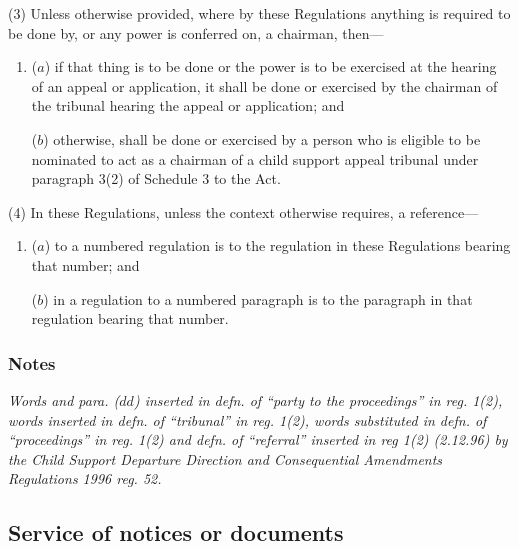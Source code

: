 \documentclass[a4paper]{article}
\newcommand\amendment[1]{\subsubsection*{Notes}{\itshape\frenchspacing\footnotesize #1 \par}}
\begin{document}
(3) Unless otherwise provided, where by these Regulations anything is required to be done by, or any power is conferred on, a chairman, then---
\begin{enumerate}\item[]
($a$) if that thing is to be done or the power is to be exercised at the hearing of an appeal or application, it shall be done or exercised by the chairman of the tribunal hearing the appeal or application; and

($b$) otherwise, shall be done or exercised by a person who is eligible to be nominated to act as a chairman of a child support appeal tribunal under paragraph 3(2) of Schedule 3 to the Act.
\end{enumerate}

(4) In these Regulations, unless the context otherwise requires, a reference---
\begin{enumerate}\item[]
($a$) to a numbered regulation is to the regulation in these Regulations bearing that number; and

($b$) in a regulation to a numbered paragraph is to the paragraph in that regulation bearing that number.
\end{enumerate}

\amendment{
Words and para. ($dd$) inserted in defn. of ``party to the proceedings'' in reg. 1(2), words inserted in defn. of ``tribunal'' in reg. 1(2), words substituted in defn. of ``proceedings'' in reg. 1(2) and defn. of ``referral'' inserted in reg 1(2) (2.12.96) by the Child Support Departure Direction and Consequential Amendments Regulations 1996 reg. 52.
}

\subsection[2. Service of notices or documents]{Service of notices or documents}

%
%
%
\end{document}
